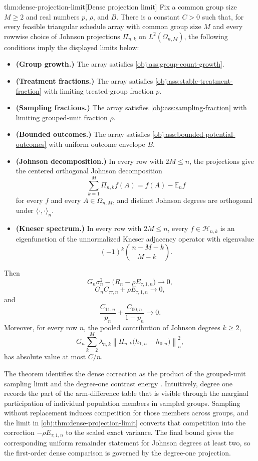 \documentclass[11pt]{article}
\begin{document}
\begin{theoremv}{thm:dense-projection-limit}[Dense projection limit]
Fix a common group size \(M\ge 2\) and real numbers \(p\), \(\rho\), and \(B\).  There is a constant \(C>0\) such that, for every feasible triangular schedule array with common group size \(M\) and every rowwise choice of Johnson projections \(\Pi_{n,k}\) on \(L^2(\Omega_{n,M})\), the following conditions imply the displayed limits below:
\begin{itemize}
\item \textbf{(Group growth.)} The array satisfies \cref{obj:ass:group-count-growth}.
\item \textbf{(Treatment fractions.)} The array satisfies \cref{obj:ass:stable-treatment-fraction} with limiting treated-group fraction \(p\).
\item \textbf{(Sampling fractions.)} The array satisfies \cref{obj:ass:sampling-fraction} with limiting grouped-unit fraction \(\rho\).
\item \textbf{(Bounded outcomes.)} The array satisfies \cref{obj:ass:bounded-potential-outcomes} with uniform outcome envelope \(B\).
\item \textbf{(Johnson decomposition.)} In every row with \(2M\le n\), the projections give the centered orthogonal Johnson decomposition
\[
\sum_{k=1}^{M}\Pi_{n,k}f(A)=f(A)-\mathbb E_n f
\]
for every \(f\) and every \(A\in\Omega_{n,M}\), and distinct Johnson degrees are orthogonal under \(\langle\cdot,\cdot\rangle_n\).
\item \textbf{(Kneser spectrum.)} In every row with \(2M\le n\), every \(f\in\mathcal H_{n,k}\) is an eigenfunction of the unnormalized Kneser adjacency operator with eigenvalue
\[
(-1)^k {\,n-M-k\choose M-k\,}.
\]
\end{itemize}
Then
\[
G_n\sigma_n^2-\bigl(R_n-\rho E_{\tau,1,n}\bigr)\to 0,
\]
\[
G_nC_{\tau\tau,n}+\rho E_{\tau,1,n}\to 0,
\]
and
\[
\frac{C_{11,n}}{p_n}+\frac{C_{00,n}}{1-p_n}\to 0.
\]
Moreover, for every row \(n\), the pooled contribution of Johnson degrees \(k\ge 2\),
\[
G_n\sum_{k=2}^{M}\lambda_{n,k}
\left\|\Pi_{n,k}\bigl(h_{1,n}-h_{0,n}\bigr)\right\|_{n}^{2},
\]
has absolute value at most \(C/n\).
\end{theoremv}

The theorem identifies the dense correction as the product of the grouped-unit sampling limit and the degree-one contrast energy . Intuitively, degree one records the part of the arm-difference table that is visible through the marginal participation of individual population members in sampled groups. Sampling without replacement induces competition for those members across groups, and the limit in \cref{obj:thm:dense-projection-limit} converts that competition into the correction \(-\rho E_{\tau,1,n}\) to the scaled exact variance. The final bound gives the corresponding uniform remainder statement for Johnson degrees at least two, so the first-order dense comparison is governed by the degree-one projection.
\end{document}
